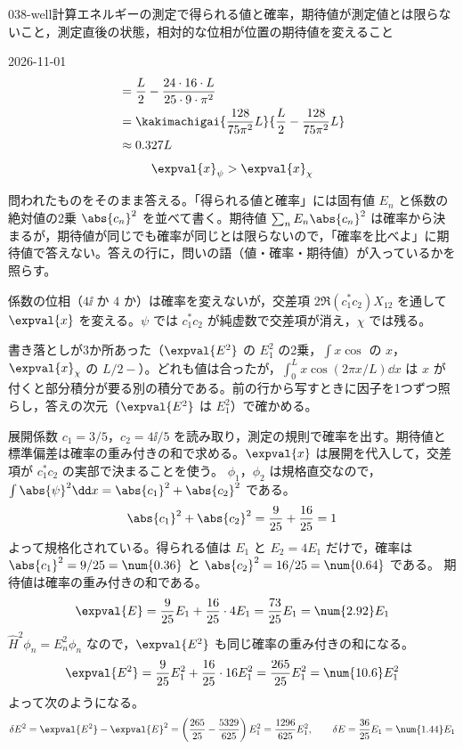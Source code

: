 \documentclass[uplatex,dvipdfmx,a4paper,11pt]{jsarticle}
\begin{document}
\begin{mondai}{038-well}{計算}{エネルギーの測定で得られる値と確率，期待値が測定値とは限らないこと，測定直後の状態，相対的な位相が位置の期待値を変えること}
\begin{kotaeutsushi}{2026-11-01}
\begin{align*}
&=\frac{L}{2}-\frac{24\cdot16\cdot L}{25\cdot9\cdot\pi^{2}}\\
&=\kakimachigai{\frac{128}{75\pi^{2}}L}{\frac{L}{2}-\frac{128}{75\pi^{2}}L}\\
&\approx 0.327L
\end{align*}
\[ \expval{x}_{\psi}>\expval{x}_{\chi} \]
\end{kotaeutsushi}
\begin{kizuki}
\item 問われたものをそのまま答える。「得られる値と確率」には固有値 $E_{n}$ と係数の絶対値の2乗 $\abs{c_{n}}^{2}$ を並べて書く。期待値 $\sum_{n}E_{n}\abs{c_{n}}^{2}$ は確率から決まるが，期待値が同じでも確率が同じとは限らないので，「確率を比べよ」に期待値で答えない。答えの行に，問いの語（値・確率・期待値）が入っているかを照らす。
\item 係数の位相（$4\ii$ か $4$ か）は確率を変えないが，交差項 $2\Re(c_{1}^{*}c_{2})X_{12}$ を通して $\expval{x}$ を変える。$\psi$ では $c_{1}^{*}c_{2}$ が純虚数で交差項が消え，$\chi$ では残る。
\item 書き落としが3か所あった（$\expval{E^{2}}$ の $E_{1}^{2}$ の2乗，$\int x\cos$ の $x$，$\expval{x}_{\chi}$ の $L/2-$）。どれも値は合ったが，$\int_{0}^{L}x\cos(2\pi x/L)\dd x$ は $x$ が付くと部分積分が要る別の積分である。前の行から写すときに因子を1つずつ照らし，答えの次元（$\expval{E^{2}}$ は $E_{1}^{2}$）で確かめる。
\end{kizuki}
\begin{tadashii}
\houshin 展開係数 $c_{1}=3/5$，$c_{2}=4\ii/5$ を読み取り，測定の規則で確率を出す。期待値と標準偏差は確率の重み付きの和で求める。$\expval{x}$ は展開を代入して，交差項が $c_{1}^{*}c_{2}$ の実部で決まることを使う。
\keisan
{} $\phi_{1}$，$\phi_{2}$ は規格直交なので，$\int\abs{\psi}^{2}\dd x=\abs{c_{1}}^{2}+\abs{c_{2}}^{2}$ である。
\[ \abs{c_{1}}^{2}+\abs{c_{2}}^{2}=\frac{9}{25}+\frac{16}{25}=1 \]
よって規格化されている。得られる値は $E_{1}$ と $E_{2}=4E_{1}$ だけで，確率は $\abs{c_{1}}^{2}=9/25=\num{0.36}$ と $\abs{c_{2}}^{2}=16/25=\num{0.64}$ である。
 期待値は確率の重み付きの和である。
\[ \expval{E}=\frac{9}{25}E_{1}+\frac{16}{25}\cdot 4E_{1}=\frac{73}{25}E_{1}=\num{2.92}E_{1} \]
$\hat{H}^{2}\phi_{n}=E_{n}^{2}\phi_{n}$ なので，$\expval{E^{2}}$ も同じ確率の重み付きの和になる。
\[ \expval{E^{2}}=\frac{9}{25}E_{1}^{2}+\frac{16}{25}\cdot 16E_{1}^{2}=\frac{265}{25}E_{1}^{2}=\num{10.6}E_{1}^{2} \]
よって次のようになる。
\[ \delta E^{2}=\expval{E^{2}}-\expval{E}^{2}=\left(\frac{265}{25}-\frac{5329}{625}\right)E_{1}^{2}=\frac{1296}{625}E_{1}^{2},\qquad \delta E=\frac{36}{25}E_{1}=\num{1.44}E_{1} \]

\end{tadashii}
\end{mondai}
\end{document}
